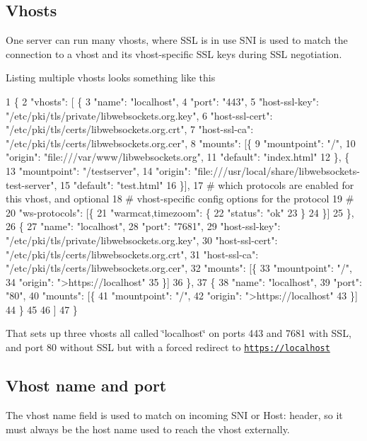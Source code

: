  \subsection*{Vhosts }

One server can run many vhosts, where S\+SL is in use S\+NI is used to match the connection to a vhost and its vhost-\/specific S\+SL keys during S\+SL negotiation.

Listing multiple vhosts looks something like this 
\begin{DoxyCode}
1 \{
2  "vhosts": [ \{
3      "name": "localhost",
4      "port": "443",
5      "host-ssl-key":  "/etc/pki/tls/private/libwebsockets.org.key",
6      "host-ssl-cert": "/etc/pki/tls/certs/libwebsockets.org.crt",
7      "host-ssl-ca":   "/etc/pki/tls/certs/libwebsockets.org.cer",
8      "mounts": [\{
9        "mountpoint": "/",
10        "origin": "file:///var/www/libwebsockets.org",
11        "default": "index.html"
12        \}, \{
13         "mountpoint": "/testserver",
14         "origin": "file:///usr/local/share/libwebsockets-test-server",
15         "default": "test.html"
16        \}],
17      # which protocols are enabled for this vhost, and optional
18      # vhost-specific config options for the protocol
19      #
20      "ws-protocols": [\{
21        "warmcat,timezoom": \{
22          "status": "ok"
23        \}
24      \}]
25     \},
26     \{
27     "name": "localhost",
28     "port": "7681",
29      "host-ssl-key":  "/etc/pki/tls/private/libwebsockets.org.key",
30      "host-ssl-cert": "/etc/pki/tls/certs/libwebsockets.org.crt",
31      "host-ssl-ca":   "/etc/pki/tls/certs/libwebsockets.org.cer",
32      "mounts": [\{
33        "mountpoint": "/",
34        "origin": ">https://localhost"
35      \}]
36    \},
37     \{
38     "name": "localhost",
39     "port": "80",
40      "mounts": [\{
41        "mountpoint": "/",
42        "origin": ">https://localhost"
43      \}]
44    \}
45 
46   ]
47 \}
\end{DoxyCode}


That sets up three vhosts all called \char`\"{}localhost\char`\"{} on ports 443 and 7681 with S\+SL, and port 80 without S\+SL but with a forced redirect to \href{https://localhost}{\tt https\+://localhost}

\subsection*{Vhost name and port }

The vhost name field is used to match on incoming S\+NI or Host\+: header, so it must always be the host name used to reach the vhost externally.


